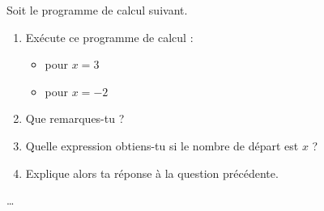 \begin{exercice*}
    Soit le programme de calcul suivant.


    \begin{enumerate}
        \item Exécute ce programme de calcul :
              \begin{itemize}
                  \item pour $x = 3$
                  \item pour $x = -2$
              \end{itemize}

        \item Que remarques-tu ?

        \item Quelle expression obtiens-tu si le nombre de départ est $x$ ?

        \item Explique alors ta réponse à la question précédente.
    \end{enumerate}
\end{exercice*}
\begin{corrige}
    \dots
\end{corrige}

